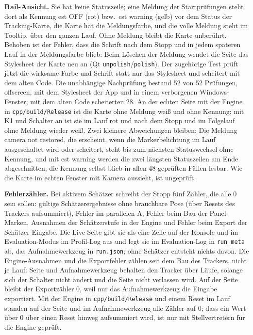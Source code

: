 \documentclass[11pt,a4paper,fleqn]{article}
\newcommand{\code}[1]{\texttt{#1}}
\begin{document}
\textbf{Rail-Ansicht.} Sie hat keine Statuszeile; eine Meldung der Startprüfungen steht dort als Kennung \glqq est
OFF\grqq{} (rot) bzw.\ \glqq est warning\grqq{} (gelb) vor dem Status der Tracking-Karte, die Karte hat die
Meldungsfarbe, und die volle Meldung steht im Tooltip, über den ganzen Lauf. Ohne Meldung bleibt die Karte unberührt.
Behoben ist der Fehler, dass die Schrift nach dem Stopp und in jedem späteren Lauf in der Meldungsfarbe blieb: Beim
Löschen der Meldung wendet die Seite das Stylesheet der Karte neu an (Qt \code{unpolish}/\code{polish}). Der
zugehörige Test prüft jetzt die wirksame Farbe und Schrift statt nur das Stylesheet und scheitert mit dem alten Code.
Die unabhängige Nachprüfung bestand 52 von 52 Prüfungen, offscreen, mit dem Stylesheet der App und in einem
verborgenen Windows-Fenster; mit dem alten Code scheiterten 28. An der echten Seite mit der Engine in
\code{cpp/build/Release} ist die Karte ohne Meldung weiß und ohne Kennung; mit K1 und Schalter an ist sie im Lauf rot
und nach dem Stopp und im Folgelauf ohne Meldung wieder weiß. Zwei kleinere Abweichungen bleiben: Die Meldung \glqq camera not
restored\grqq{}, die erscheint, wenn die Markerbelichtung im Lauf ausgeschaltet wird oder scheitert, steht bis zum
nächsten Statuswechsel ohne Kennung, und mit \glqq est warning\grqq{} werden die zwei längsten Statuszeilen am Ende
abgeschnitten; die Kennung selbst blieb in allen 48 geprüften Fällen lesbar. Wie die Karte im echten Fenster mit
Kamera aussieht, ist ungeprüft.

\textbf{Fehlerzähler.} Bei aktivem Schätzer schreibt der Stopp fünf Zähler, die alle 0 sein sollen: gültige
Schätzerergebnisse ohne brauchbare Pose (über Resets des Trackers aufsummiert), Fehler im parallelen A, Fehler beim Bau
der Panel-Marken, Ausnahmen der Schätzerstufe in der Engine und Fehler beim Export der Schätzer-Eingabe. Die Live-Seite
gibt sie als eine Zeile auf der Konsole und im Evaluation-Modus im Profil-Log aus und legt sie im Evaluation-Log in \code{run\_meta} ab, das
Aufnahmewerkzeug in \code{run.json}; ohne Schätzer entsteht nichts davon. Die Engine-Ausnahmen und die Exportfehler
zählen seit dem Bau des Trackers, nicht je Lauf: Seite und Aufnahmewerkzeug behalten den Tracker über Läufe, solange
sich der Schalter nicht ändert und die Seite nicht verlassen wird. Auf der Seite bleibt der Exportzähler 0, weil nur das Aufnahmewerkzeug die Eingabe
exportiert. Mit der Engine in \code{cpp/build/Release} und einem Reset im Lauf standen auf der Seite und im
Aufnahmewerkzeug alle Zähler auf 0; dass ein Wert über 0 über einen Reset hinweg aufsummiert wird, ist nur mit
Stellvertretern für die Engine geprüft.
\end{document}
